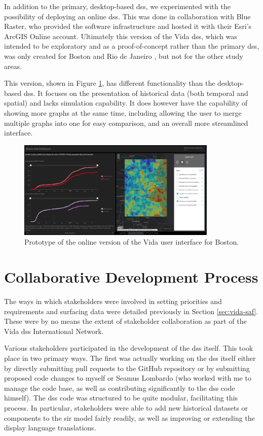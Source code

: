 In addition to the primary, desktop-based \ac{dss}, we experimented with the possibility of deploying an online \ac{dss}. This was done in collaboration with Blue Raster, who provided the software infrastructure and hosted it with their Esri's ArcGIS Online account. Ultimately this version of the Vida \ac{dss}, which was intended to be exploratory and as a proof-of-concept rather than the primary \ac{dss}, was only created for Boston \cite{bluerasterMITVidaSupportBoston2021} and Rio de Janeiro \cite{bluerasterRioJaneiroVida2021}, but not for the other study areas. 

This version, shown in Figure \ref{fig:vidab}, has different functionality than the desktop-based \ac{dss}. It focuses on the presentation of historical data (both temporal and spatial) and lacks simulation capability. It does however have the capability of showing more graphs at the same time, including allowing the user to merge multiple graphs into one for easy comparison, and an overall more streamlined interface. 

\begin{figure}[!htb]
\centering
\includegraphics[width=0.85\textwidth]{Figures/chap5/VidaBlueScreenshot.jpg}
\caption{Prototype of the online version of the Vida user interface for Boston.}
\label{fig:vidab}
\end{figure}

\section{Collaborative Development Process} \label{sec:vida-collab}

The ways in which stakeholders were involved in setting priorities and requirements and surfacing data were detailed previously in Section \ref{sec:vida-saf}. These were by no means the extent of stakeholder collaboration as part of the Vida \ac{dss} International Network.

Various stakeholders participated in the development of the \ac{dss} itself. This took place in two primary ways. The first was actually working on the \ac{dss} itself either by directly submitting pull requests to the GitHub repository or by submitting proposed code changes to myself or Seamus Lombardo (who worked with me to manage the code base, as well as contributing significantly to the \ac{dss} code himself). The \ac{dss} code was structured to be quite modular, facilitating this process. In particular, stakeholders were able to add new historical datasets or components to the \ac{sir} model fairly readily, as well as improving or extending the display language translations. 

